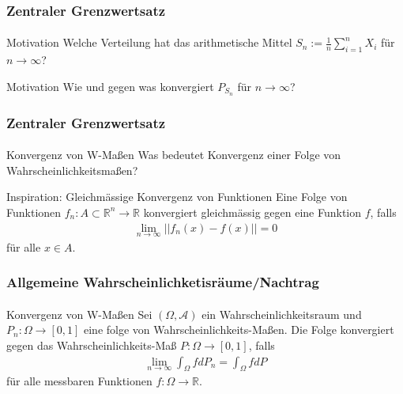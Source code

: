\documentclass{beamer}
\begin{document}
\begin{frame}
    \frametitle{Zentraler Grenzwertsatz}
\framesubtitle{}

\begin{block}{Motivation}
Welche Verteilung hat das arithmetische Mittel $S_n:= \frac{1}{n} \sum_{i=1}^n X_i$ für $n \to \infty$?
\end{block}
\begin{block}{Motivation}
Wie und gegen was konvergiert $P_{S_n}$ für $n \to \infty$?
\end{block}

 \end{frame}



\begin{frame}
    \frametitle{Zentraler Grenzwertsatz}
\framesubtitle{}

\begin{block}{Konvergenz von W-Maßen}
Was bedeutet Konvergenz einer Folge von Wahrscheinlichkeitsmaßen?
\end{block}
\begin{block}{Inspiration: Gleichmässige Konvergenz von Funktionen}
Eine Folge von Funktionen $f_n: A \subset \mathbb{R}^n \to \mathbb{R}$ konvergiert gleichmässig gegen eine Funktion $f$, falls 
\begin{align*}
\lim_{n \to \infty} ||f_n(x) -f(x) || = 0
\end{align*}
für alle $x \in A$.
\end{block}

 \end{frame}

\begin{frame}
    \frametitle{Allgemeine Wahrscheinlichketisräume/Nachtrag}
\framesubtitle{}

\begin{block}{Konvergenz von W-Maßen}
Sei $(\Omega, \mathcal{A})$ ein Wahrscheinlichkeitsraum und $P_n : \Omega \to [0,1]$ eine folge von Wahrscheinlichkeits-Maßen. Die Folge konvergiert gegen
das Wahrscheinlichkeits-Maß $P: \Omega \to [0,1]$, falls 
\begin{align*}
\lim_{n \to \infty} \int_\Omega f dP_n = \int_\Omega f dP
\end{align*}
für alle messbaren Funktionen $f: \Omega \to \mathbb{R}$.
\end{block}
 \end{frame}
\end{document}
